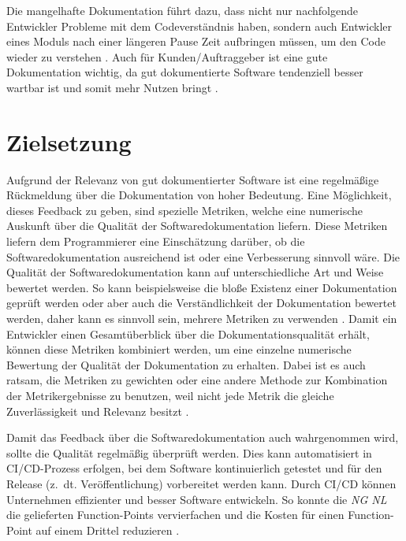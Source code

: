Die mangelhafte Dokumentation führt dazu, dass nicht nur nachfolgende Entwickler Probleme mit dem Codeverständnis haben, sondern auch Entwickler eines Moduls nach einer längeren Pause Zeit aufbringen müssen, um den Code wieder zu verstehen \cite[S. 511]{vestdam}.  Auch für Kunden/Auftraggeber ist eine gute Dokumentation wichtig, da gut dokumentierte Software tendenziell besser wartbar ist und somit mehr Nutzen bringt \cite[S. 83]{Qualityanalysisofsourcecodecomments} \cite[S. 1]{SoftwareDocumentationManagementIssuesandPractices:ASurvey}.



\section{Zielsetzung}
Aufgrund der Relevanz von gut dokumentierter Software ist eine regelmäßige Rückmeldung über die Dokumentation von hoher Bedeutung. Eine Möglichkeit, dieses Feedback zu geben, sind spezielle Metriken, welche eine numerische Auskunft über die Qualität der Softwaredokumentation liefern. Diese Metriken liefern dem Programmierer eine Einschätzung darüber, ob die Softwaredokumentation ausreichend ist oder eine Verbesserung sinnvoll wäre. Die Qualität der Softwaredokumentation kann auf unterschiedliche Art und Weise bewertet werden. So kann beispielsweise die bloße Existenz einer Dokumentation geprüft werden oder aber auch die Verständlichkeit der Dokumentation bewertet werden, daher kann es sinnvoll sein, mehrere Metriken zu verwenden \cite[S. 29]{Pfleeger2005UsingMM}. Damit ein Entwickler einen Gesamtüberblick über die Dokumentationsqualität erhält, können diese Metriken kombiniert werden, um eine einzelne numerische Bewertung der Qualität der Dokumentation zu erhalten. 
Dabei ist es auch ratsam, die Metriken zu gewichten oder eine andere Methode zur Kombination der Metrikergebnisse zu benutzen, weil nicht jede Metrik die gleiche Zuverlässigkeit und Relevanz besitzt \cite[S. 1117ff.]{Softwarequalitymetricsaggregationinindustry}.

Damit das Feedback über die Softwaredokumentation auch wahrgenommen wird, sollte die Qualität regelmäßig  überprüft werden. Dies kann automatisiert in \ac{CI/CD}-Prozess erfolgen, bei dem Software kontinuierlich getestet und für den Release (z.~dt. Veröffentlichung) vorbereitet werden kann. Durch CI/CD können Unternehmen effizienter und besser Software entwickeln. So konnte die \textit{NG NL} die gelieferten Function-Points vervierfachen und die Kosten für einen Function-Point auf einem Drittel reduzieren \cite[S. 520]{Vassallo2016}.

